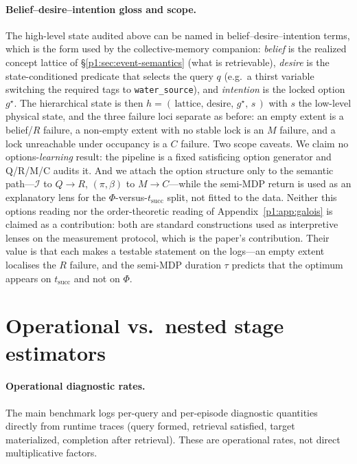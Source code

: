 \documentclass{article}
\newcommand{\method}[1]{\texttt{#1}}
\begin{document}
\paragraph{Belief--desire--intention gloss and scope.}
The high-level state audited above can be named in
belief--desire--intention terms, which is the form used by the
collective-memory companion: \emph{belief} is the realized concept
lattice of \S\ref{p1:sec:event-semantics} (what is retrievable), \emph{desire}
is the state-conditioned predicate that selects the query $q$ (e.g.\ a
thirst variable switching the required tags to \method{water\_source}),
and \emph{intention} is the locked option $g^\star$. The hierarchical
state is then $h=(\,\text{lattice},\,\text{desire},\,g^\star,\,s\,)$ with
$s$ the low-level physical state, and the three failure loci separate as
before: an empty extent is a belief/$R$ failure, a non-empty extent
with no stable lock is an $M$ failure, and a lock unreachable under
occupancy is a $C$ failure. Two scope caveats. We claim no
options-\emph{learning} result: the pipeline is a fixed satisficing option
generator \citep{simon1955behavioral} and Q/R/M/C audits it. And we attach
the option structure only to the semantic path---$\mathcal{I}$ to
$Q\!\rightarrow\!R$, $(\pi,\beta)$ to $M\!\rightarrow\!C$---while the
semi-MDP return is used as an explanatory lens for the
$\Phi$-versus-$t_{\mathrm{succ}}$ split, not fitted to the data. Neither
this options reading nor the order-theoretic reading of
Appendix~\ref{p1:app:galois} is claimed as a contribution: both are standard
constructions used as interpretive lenses on the measurement protocol,
which is the paper's contribution. Their value is that each makes a
testable statement on the logs---an empty extent localises the $R$
failure, and the semi-MDP duration $\tau$ predicts that the optimum
appears on $t_{\mathrm{succ}}$ and not on $\Phi$.

\section{Operational vs.\ nested stage estimators}
\label{p1:app:estimators}

\paragraph{Operational diagnostic rates.}
The main benchmark logs per-query and per-episode diagnostic quantities directly from runtime traces (query formed, retrieval satisfied, target materialized, completion after retrieval). These are operational rates, not direct multiplicative factors.
\end{document}
